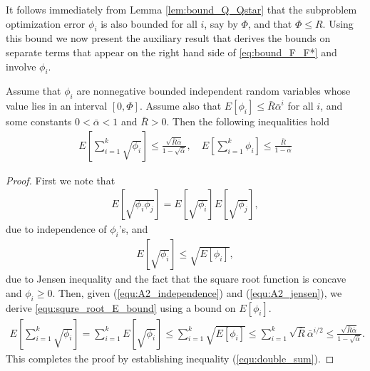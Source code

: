 \documentclass[11pt]{article}
\numberwithin{equation}{section}
\begin{document}
It follows immediately from Lemma \ref{lem:bound_Q_Qstar} that the subproblem optimization error $\phi_i$ is also  bounded for all $i$, say by $\Phi$, and that $\Phi \leq R$. 
Using this bound we now present the auxiliary result that derives the bounds on separate terms that appear on the right hand side of \eqref{eq:bound_F_F*} and involve $\phi_i$. 

\begin{lemma}\label{lem:E_bound}
Assume that $\phi_i$ are nonnegative bounded independent random variables whose value lies in an interval $[0, \Phi]$. Assume also that $E[\phi_i] \leq \bar R \bar \alpha^i$ for all $i$, and some constants  $0 < \bar \alpha < 1$ and $\bar R > 0$.  Then the following inequalities hold 
\begin{align}
    \label{equ:squre_root_E_bound}
    E[\sum_{i=1}^{k} \sqrt{\phi_i}] \leq \frac{ \sqrt{\bar{R} \bar\alpha}}{ 1 - \sqrt{\bar\alpha}}, \quad
    E[\sum_{i=1}^{k} \phi_i] \leq \frac{ \bar{R}}{ 1 - \bar\alpha}
\end{align} 
\end{lemma}
\begin{proof}
    First we note that 
    \begin{align}
        \label{equ:A2_independence}
        E[\sqrt{\phi_i \phi_j}] = E[\sqrt{\phi_i}] E[\sqrt{\phi_j}],
    \end{align}
    due to independence of $\phi_i$'s, and
    \begin{align}
        \label{equ:A2_jensen}
        E[\sqrt{\phi_i}] \leq \sqrt{E[\phi_i]},
    \end{align}
    due to Jensen inequality and the fact that the square root function is concave and $\phi_i\geq 0$. Then, given (\ref{equ:A2_independence}) and (\ref{equ:A2_jensen}), we  derive \eqref{equ:squre_root_E_bound}  using a bound on $E[\phi_i]$.
    \begin{align*}
        E[\sum_{i=1}^{k} \sqrt{\phi_i}]
        = \sum_{i=1}^k E[\sqrt{\phi_i}] \leq \sum_{i=1}^k \sqrt{E[\phi_i]} \leq \sum_{i=1}^k \sqrt{\bar{R}}\bar\alpha^{i/2} \leq \frac{\sqrt{\bar{R}\bar\alpha}}{1 - \sqrt{\bar\alpha}}.
    \end{align*}
This completes the proof by establishing inequality (\ref{equ:double_sum}). 
\end{proof}
\end{document}
